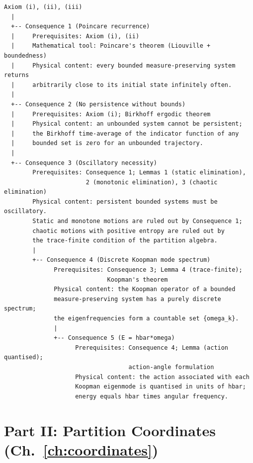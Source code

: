 \begin{center}
\small\ttfamily
\begin{verbatim}
Axiom (i), (ii), (iii)
  |
  +-- Consequence 1 (Poincare recurrence)
  |     Prerequisites: Axiom (i), (ii)
  |     Mathematical tool: Poincare's theorem (Liouville + boundedness)
  |     Physical content: every bounded measure-preserving system returns
  |     arbitrarily close to its initial state infinitely often.
  |
  +-- Consequence 2 (No persistence without bounds)
  |     Prerequisites: Axiom (i); Birkhoff ergodic theorem
  |     Physical content: an unbounded system cannot be persistent;
  |     the Birkhoff time-average of the indicator function of any
  |     bounded set is zero for an unbounded trajectory.
  |
  +-- Consequence 3 (Oscillatory necessity)
        Prerequisites: Consequence 1; Lemmas 1 (static elimination),
                       2 (monotonic elimination), 3 (chaotic elimination)
        Physical content: persistent bounded systems must be oscillatory.
        Static and monotone motions are ruled out by Consequence 1;
        chaotic motions with positive entropy are ruled out by
        the trace-finite condition of the partition algebra.
        |
        +-- Consequence 4 (Discrete Koopman mode spectrum)
              Prerequisites: Consequence 3; Lemma 4 (trace-finite);
                             Koopman's theorem
              Physical content: the Koopman operator of a bounded
              measure-preserving system has a purely discrete spectrum;
              the eigenfrequencies form a countable set {omega_k}.
              |
              +-- Consequence 5 (E = hbar*omega)
                    Prerequisites: Consequence 4; Lemma (action quantised);
                                   action-angle formulation
                    Physical content: the action associated with each
                    Koopman eigenmode is quantised in units of hbar;
                    energy equals hbar times angular frequency.
\end{verbatim}
\end{center}

\section*{Part II: Partition Coordinates (Ch.~\ref{ch:coordinates})}

